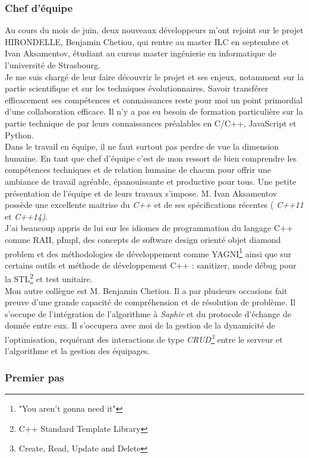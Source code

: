 \documentclass[french, 11pt]{memoir}
\begin{document}
\subsubsection{Chef d'équipe}\label{chef-duxe9quipe}

Au cours du mois de juin, deux nouveaux développeurs m'ont rejoint sur
le projet HIRONDELLE, Benjamin Chetiou, qui rentre au master ILC en
septembre et Ivan Aksamentov, étudiant au cursus master ingénierie en
informatique de l'université de Strasbourg. \\ Je me suis chargé de leur
faire découvrir le projet et ses enjeux, notamment sur la partie
scientifique et sur les techniques évolutionnaires. Savoir transférer
efficacement ses compétences et connaissances reste pour moi un point
primordial d'une collaboration efficace. Il n'y a pas eu besoin de
formation particulière sur la partie technique de par leurs
connaissances préalables en C/C++, JavaScript et Python.\\
Dans le travail en équipe, il ne faut surtout pas perdre de vue la
dimension humaine. En tant que chef d'équipe c'est de mon ressort de
bien comprendre les compétences techniques et de relation humaine de
chacun pour offrir une ambiance de travail agréable, épanouissante et
productive pour tous. Une petite présentation de l'équipe et de leurs
travaux s'impose. M. Ivan Aksamentov possède une excellente maitrise du
\emph{C++} et de ses spécifications récentes ( \textit{C++11} et \emph{C++14)}. \\
J'ai beaucoup appris de lui sur les idiomes de programmation du langage
C++ comme RAII, pImpl, des concepts de software design orienté objet
diamond problem et des méthodologies de développement comme YAGNI\footnote{"You aren't gonna need it"} ainsi
que sur certains outils et méthode de développement C++ : sanitizer,
mode débug pour la STL\footnote{C++ Standard Template Library} et test unitaire. \\
Mon autre collègue est M.
Benjamin Chetiou. Il a par plusieurs occasions fait preuve d'une grande
capacité de compréhension et de résolution de problème. Il s'occupe de
l'intégration de l'algorithme à \emph{Saphir} et du protocole d'échange
de donnée entre eux. Il s'occupera avec moi de la gestion de la
dynamicité de l'optimisation, requérant des interactions de type
\emph{CRUD\footnote{Create, Read, Update and Delete}} entre le serveur et l'algorithme et la gestion des
équipages.

\subsubsection{Premier pas}\label{premier-pas}
\end{document}
